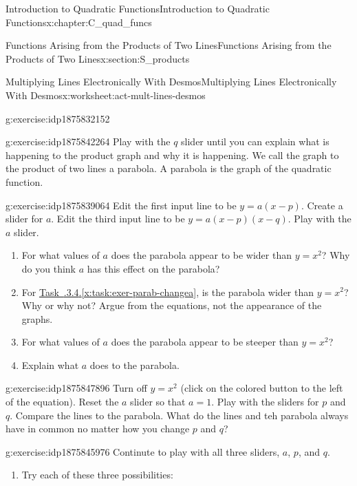 \documentclass[oneside,10pt,]{book}
\newcommand{\xreffont}{\relax}
\numberwithin{equation}{chapter}
\begin{document}
\begin{chapterptx}{Introduction to Quadratic Functions}{}{Introduction to Quadratic Functions}{}{}{x:chapter:C_quad_funcs}
\begin{sectionptx}{Functions Arising from the Products of Two Lines}{}{Functions Arising from the Products of Two Lines}{}{}{x:section:S_products}
\begin{worksheet-subsection}{Multiplying Lines Electronically With Desmos}{}{Multiplying Lines Electronically With Desmos}{}{}{x:worksheet:act-mult-lines-desmos}
\begin{divisionexercise}{2}{}{}{g:exercise:idp1875832152}
\begin{enumerate}[font=\bfseries,label=(\alph*),ref=\alph*]
\end{enumerate}
\end{divisionexercise}%
\begin{divisionexercise}{3}{}{}{g:exercise:idp1875842264}%
Play with the \(q\) slider until you can explain what is happening to the product graph and why it is happening. We call the graph to the product of two lines a parabola. A parabola is the graph of the quadratic function.%
\end{divisionexercise}%
\begin{divisionexercise}{4}{}{}{g:exercise:idp1875839064}%
Edit the first input line to be \(y = a (x - p)\). Create a slider for \(a\). Edit the third input line to be \(y = a (x - p)(x - q)\). Play with the \(a\) slider.%
\begin{enumerate}[font=\bfseries,label=(\alph*),ref=\alph*]
\item\label{x:task:exer-parab-changea}For what values of \(a\) does the parabola appear to be wider than \(y = x^2\)? Why do you think \(a\) has this effect on the parabola?%
\item{}For \hyperref[x:task:exer-parab-changea]{Task~{\xreffont 4.2.3.4}.{\xreffont\ref{x:task:exer-parab-changea}}}, is the parabola wider than \(y = x^2\)? Why or why not? Argue from the equations, not the appearance of the graphs.%
\item{}For what values of \(a\) does the parabola appear to be steeper than \(y = x^2\)?%
\item{}Explain what \(a\) does to the parabola.%
\end{enumerate}
\end{divisionexercise}%
\begin{divisionexercise}{5}{}{}{g:exercise:idp1875847896}%
Turn off \(y = x^2\) (click on the colored button to the left of the equation). Reset the \(a\) slider so that \(a = 1\). Play with the sliders for \(p\) and \(q\). Compare the lines to the parabola. What do the lines and teh parabola always have in common no matter how you change \(p\) and \(q\)?%
\end{divisionexercise}%
\begin{divisionexercise}{6}{}{}{g:exercise:idp1875845976}%
Continute to play with all three sliders, \(a\), \(p\), and \(q\).%
\begin{enumerate}[font=\bfseries,label=(\alph*),ref=\alph*]
\item{}Try each of these three possibilities:%
\begin{enumerate}[font=\bfseries,label=(\roman*),ref=\theenumi.\roman*]

\end{enumerate}
\end{enumerate}
\end{divisionexercise}
\end{worksheet-subsection}
\end{sectionptx}
\end{chapterptx}
\end{document}
